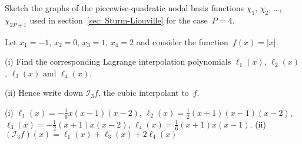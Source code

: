 \begin{Exercises}
\exercise
Sketch the graphs of the piecewise-quadratic nodal basis functions $\chi_1$, 
$\chi_2$, \dots, $\chi_{2P+1}$ used in section~\ref{sec: Sturm-Liouville}
for the case~$P=4$.

\exercise
Let $x_1=-1$, $x_2=0$, $x_3=1$, $x_4=2$ and consider the 
function~$f(x)=|x|$.
\begin{description}
\item{(i)} Find the corresponding Lagrange interpolation polynomials 
$\ell_1(x)$, $\ell_2(x)$, $\ell_3(x)$ and $\ell_4(x)$.
\item{(ii)} Hence write down $\mathcal{I}_3f$, the cubic interpolant to~$f$.
\end{description}
\begin{ans}
(i) $\ell_1(x)=-\tfrac16 x(x-1)(x-2)$, $\ell_2(x)=\tfrac12(x+1)(x-1)(x-2)$,
$\ell_3(x)=-\tfrac12(x+1)x(x-2)$, $\ell_4(x)=\tfrac16(x+1)x(x-1)$.\quad
(ii) $(\mathcal{I}_3f)(x)=\ell_1(x)+\ell_3(x)+2\ell_4(x)$
\end{ans}


\end{Exercises}

